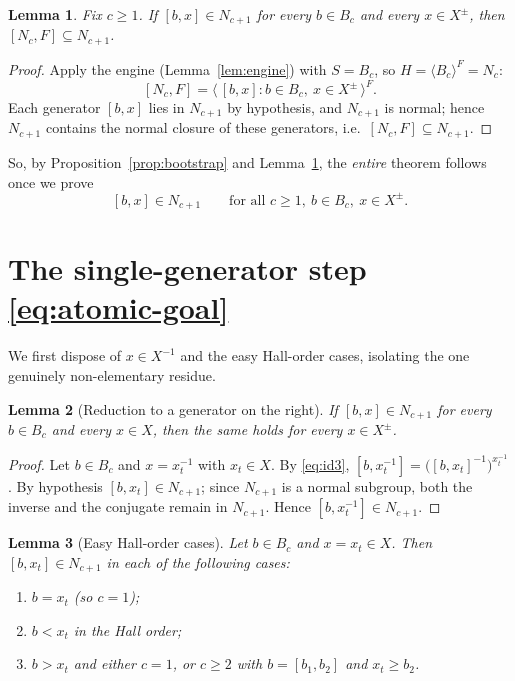 \documentclass{amsart}
\newtheorem{lemma}{Lemma}
\theoremstyle{definition}
\theoremstyle{remark}
\begin{document}
\begin{lemma}\label{lem:reduce-atomic}
Fix $c\ge1$. If $[b,x]\in N_{c+1}$ for every $b\in B_c$ and every $x\in X^{\pm}$,
then $[N_c,F]\subseteq N_{c+1}$.
\end{lemma}

\begin{proof}
Apply the engine (Lemma~\ref{lem:engine}) with $S=B_c$, so $H=\langle
B_c\rangle^{F}=N_c$:
\[
[N_c,F]=\big\langle\,[b,x] : b\in B_c,\ x\in X^{\pm}\,\big\rangle^{F}.
\]
Each generator $[b,x]$ lies in $N_{c+1}$ by hypothesis, and $N_{c+1}$ is normal;
hence $N_{c+1}$ contains the normal closure of these generators, i.e.\
$[N_c,F]\subseteq N_{c+1}$.
\end{proof}

So, by Proposition~\ref{prop:bootstrap} and Lemma~\ref{lem:reduce-atomic}, the
\emph{entire} theorem follows once we prove
\begin{equation}\label{eq:atomic-goal}
[b,x]\in N_{c+1}\qquad\text{for all }c\ge1,\ b\in B_c,\ x\in X^{\pm}.
\end{equation}

\section{The single-generator step \eqref{eq:atomic-goal}}\label{sec:atomic}

We first dispose of $x\in X^{-1}$ and the easy Hall-order cases, isolating the one
genuinely non-elementary residue.

\begin{lemma}[Reduction to a generator on the right]\label{lem:rightgen}
If $[b,x]\in N_{c+1}$ for every $b\in B_c$ and every $x\in X$, then the same holds
for every $x\in X^{\pm}$.
\end{lemma}

\begin{proof}
Let $b\in B_c$ and $x=x_t^{-1}$ with $x_t\in X$. By \eqref{eq:id3},
$[b,x_t^{-1}]=\big([b,x_t]^{-1}\big)^{x_t^{-1}}$. By hypothesis $[b,x_t]\in
N_{c+1}$; since $N_{c+1}$ is a normal subgroup, both the inverse and the conjugate
remain in $N_{c+1}$. Hence $[b,x_t^{-1}]\in N_{c+1}$.
\end{proof}

\begin{lemma}[Easy Hall-order cases]\label{lem:easycases}
Let $b\in B_c$ and $x=x_t\in X$. Then $[b,x_t]\in N_{c+1}$ in each of the following
cases:
\begin{enumerate}
\item[(i)] $b=x_t$ (so $c=1$);
\item[(ii)] $b<x_t$ in the Hall order;
\item[(iii)] $b>x_t$ and either $c=1$, or $c\ge2$ with $b=[b_1,b_2]$ and
$x_t\ge b_2$.
\end{enumerate}
\end{lemma}
\end{document}

